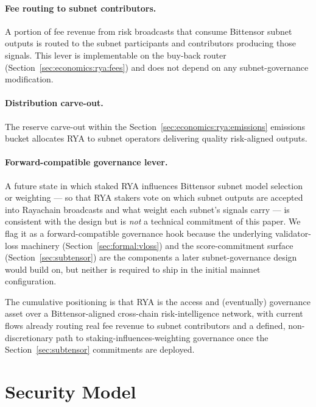\documentclass[11pt,a4paper]{article}
\begin{document}
\paragraph{Fee routing to subnet contributors.} A portion of fee revenue from risk
broadcasts that consume Bittensor subnet outputs is routed to the subnet
participants and contributors producing those signals. This lever is implementable
on the buy-back router (Section~\ref{sec:economics:rya:fees}) and does not depend
on any subnet-governance modification.

\paragraph{Distribution carve-out.} The reserve carve-out within the
Section~\ref{sec:economics:rya:emissions} emissions bucket allocates RYA to subnet
operators delivering quality risk-aligned outputs.

\paragraph{Forward-compatible governance lever.} A future state in which staked
RYA influences Bittensor subnet model selection or weighting --- so that RYA
stakers vote on which subnet outputs are accepted into Rayachain broadcasts and
what weight each subnet's signals carry --- is consistent with the design but is
\emph{not} a technical commitment of this paper. We flag it as a forward-compatible
governance hook because the underlying validator-loss machinery
(Section~\ref{sec:formal:vloss}) and the score-commitment surface
(Section~\ref{sec:subtensor}) are the components a later subnet-governance design
would build on, but neither is required to ship in the initial mainnet
configuration.

The cumulative positioning is that RYA is the access and (eventually) governance
asset over a Bittensor-aligned cross-chain risk-intelligence network, with current
flows already routing real fee revenue to subnet contributors and a defined,
non-discretionary path to staking-influences-weighting governance once the
Section~\ref{sec:subtensor} commitments are deployed.

\section{Security Model}\label{sec:security}
\end{document}
